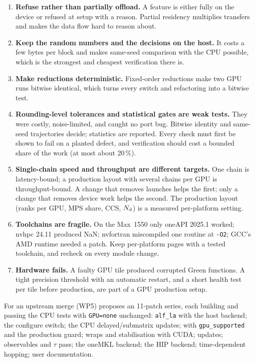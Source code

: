 \begin{enumerate}
\item \textbf{Refuse rather than partially offload.} A feature is either fully on the device or refused at setup with a reason. Partial residency multiplies transfers and makes the data flow hard to reason about.
\item \textbf{Keep the random numbers and the decisions on the host.} It costs a few bytes per block and makes same-seed comparison with the CPU possible, which is the strongest and cheapest verification there is.
\item \textbf{Make reductions deterministic.} Fixed-order reductions make two GPU runs bitwise identical, which turns every switch and refactoring into a bitwise test.
\item \textbf{Rounding-level tolerances and statistical gates are weak tests.} They were costly, noise-limited, and caught no port bug. Bitwise identity and same-seed trajectories decide; statistics are reported. Every check must first be shown to fail on a planted defect, and verification should cost a bounded share of the work (at most about 20\,\%).
\item \textbf{Single-chain speed and throughput are different targets.} One chain is latency-bound; a production layout with several chains per GPU is throughput-bound. A change that removes launches helps the first; only a change that removes device work helps the second. The production layout (ranks per GPU, MPS share, CCS, $N_{\rm d}$) is a measured per-platform setting.
\item \textbf{Toolchains are fragile.} On the Max~1550 only oneAPI 2025.1 worked; nvhpc 24.11 produced NaN; nvfortran miscompiled one routine at \texttt{-O2}; GCC's AMD runtime needed a patch. Keep per-platform pages with a tested toolchain, and recheck on every module change.
\item \textbf{Hardware fails.} A faulty GPU tile produced corrupted Green functions. A tight precision threshold with an automatic restart, and a short health test per tile before production, are part of a GPU production setup.
\end{enumerate}

For an upstream merge  (WP5) proposes an 11-patch series, each building and passing the CPU tests with \texttt{GPU=none} unchanged: \texttt{alf\_la} with the host backend; the configure switch; the CPU delayed/submatrix updates;  with \texttt{gpu\_supported} and the production guard; wraps and stabilisation with CUDA; updates; observables and $\tau$ pass; the oneMKL backend; the HIP backend; time-dependent hopping; user documentation.
